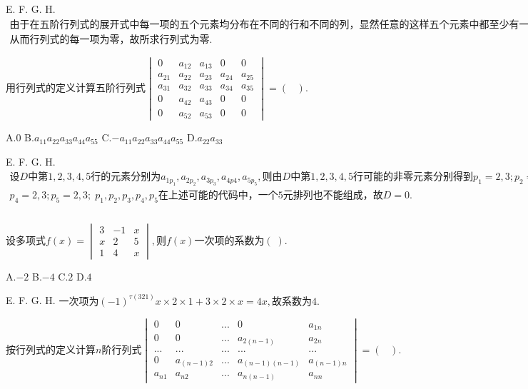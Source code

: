 E.   F.   G.   H.
$\begin{array}{l}\mathrm{由于在五阶行列式的展开式中每一项的五个元素均分布在不同的行和不同的列}，\mathrm{显然任意的这样五个元素中都至少有一个为零}\\\mathrm{从而行列式的每一项为零}，\mathrm{故所求行列式为零}.\end{array}$


$\mathrm{用行列式的定义计算五阶行列式}\begin{vmatrix}0&a_{12}&a_{13}&0&0\\a_{21}&a_{22}&a_{23}&a_{24}&a_{25}\\a_{31}&a_{32}&a_{33}&a_{34}&a_{35}\\0&a_{42}&a_{43}&0&0\\0&a_{52}&a_{53}&0&0\end{vmatrix}=(\;\;\;).$

A.$0$   B.$a_{11}a_{22}a_{33}a_{44}a_{55}$   C.$-a_{11}a_{22}a_{33}a_{44}a_{55}$   D.$a_{22}a_{33}$

E.   F.   G.   H.
$\begin{array}{l}设D\mathrm{中第}1,2,3,4,5\mathrm{行的元素分别为}a_{1p_1},a_{2p_2},a_{3p_3},a_{4p4},a_{5p_5},\mathrm{则由}D\mathrm{中第}1,2,3,4,5\mathrm{行可能的非零元素分别得到}p_1=2,3;p_2=1,2,3,4,5;p_3=1,2,3,4,5\\p_4=2,3;p_5=2,3;\;p_1,p_2,p_3,p_4,p_5\mathrm{在上述可能的代码中}，\mathrm{一个}5\mathrm{元排列也不能组成}，故D=0.\\\\\end{array}$


$\mathrm{设多项式}f(x)=\begin{vmatrix}3&-1&x\\x&2&5\\1&4&x\end{vmatrix},则f(x)\mathrm{一次项的系数为}(\;).$

A.$-2$   B.$-4$   C.$2$   D.$4$

E.   F.   G.   H.
$\mathrm{一次项为}(-1)^{\tau(321)}x\times2\times1+3\times2\times x=4x,\mathrm{故系数为}4.$


$\mathrm{按行列式的定义计算}n\mathrm{阶行列式}\begin{vmatrix}0&0&...&0&a_{1n}\\0&0&...&a_{2(n-1)}&a_{2n}\\...&...&...&...&...\\0&a_{(n-1)2}&...&a_{(n-1)(n-1)}&a_{(n-1)n}\\a_{n1}&a_{n2}&...&a_{n(n-1)}&a_{nn}\end{vmatrix}=(\;\;\;).$

